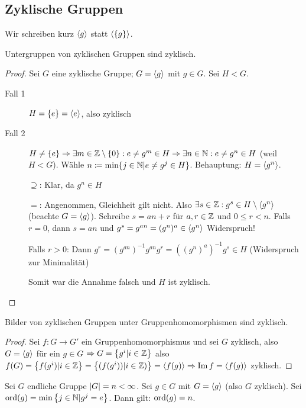 \documentclass[12pt,a4paper]{scrartcl}
\begin{document}
\subsection{Zyklische Gruppen} \label{ch:zyklisch}
Wir schreiben kurz $\langle g\rangle$ statt $\langle\{g\}\rangle$.
\begin{satz}
	Untergruppen von zyklischen Gruppen sind zyklisch.
\end{satz}

\begin{proof}
	Sei $G$ eine zyklische Gruppe; $G = \langle g\rangle$ mit $g\in G$. Sei $H<G$.\begin{description}
		\item[Fall 1] $H = \{e\} = \langle e\rangle$, also zyklisch
		\item[Fall 2] $H\neq \{e\}\Rightarrow \exists m\in \mathbb Z\setminus\{0\}: e\neq g^m\in H\Rightarrow \exists n\in \mathbb N: e\neq g^n\in H$ (weil $H<G$). Wähle $n \coloneqq \min\{j\in \mathbb N|e\neq g^j\in H\}$. Behauptung: $H = \langle g^n\rangle$.
		
		\glqq$\supseteq$\grqq: Klar, da $g^n\in H$
		
		\glqq$=$\grqq: Angenommen, Gleichheit gilt nicht. Also $\exists s\in \mathbb Z: g^s\in H\setminus\langle g^n\rangle$ (beachte $G = \langle g\rangle$). Schreibe $s = an+r$ für $a,r\in \mathbb Z$ und $0\leq r<n$. Falls $r = 0$, dann $s = an$ und $g^s = g^{an} = (g^n)^a\in \langle g^n\rangle$ Widerspruch!
		
		Falls $r>0$: Dann $g^r = (g^{an})^{-1}g^{an}g^r = ((g^n)^a)^{-1}g^s\in H$ (Widerspruch zur Minimalität)
		
		Somit war die Annahme falsch und $H$ ist zyklisch.
  \qedhere
	\end{description}
\end{proof}


\begin{lem}
	Bilder von zyklischen Gruppen unter Gruppenhomomorphismen sind zyklisch.
\end{lem}

\begin{proof}
	Sei $f: G \rightarrow G'$ ein Gruppenhomomorphismus und sei $G$ zyklisch, also $G = \langle g\rangle$ für ein $g \in G$ $\Rightarrow G = \left\lbrace g^i | i \in \mathbb Z \right\rbrace$ also $f(G) = \left\lbrace f(g^i) | i\in \mathbb Z \right\rbrace = \left\lbrace (f(g^i)) | i \in \mathbb Z)\right\rbrace = \langle f(g)\rangle \Rightarrow \operatorname{Im} f = \langle f(g)\rangle$ zyklisch.
\end{proof}

\begin{lem} \label{lem:ord}
	Sei $G$ endliche Gruppe $\lvert G\rvert = n < \infty$. Sei $g \in G$ mit $G=\langle g\rangle$ \textup(also $G$ zyklisch\textup).
	Sei $\operatorname{ord}(g) = \min \left\lbrace j \in \mathbb N | g^j = e\right\rbrace $.
	Dann gilt: $\operatorname{ord}(g) = n$. 
\end{lem}
\end{document}
